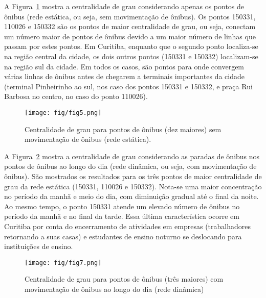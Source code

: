 
A Figura~\ref{fig:centralidade-grau-estatica} mostra a centralidade de grau considerando apenas os pontos de ônibus (rede estática, ou seja, sem movimentação de ônibus). Os pontos 150331, 110026 e 150332 são os pontos de maior centralidade de grau, ou seja, conectam um número maior de pontos de ônibus devido a um maior número de linhas que passam por estes pontos. Em Curitiba, enquanto que o segundo ponto localiza-se na região central da cidade, os dois outros pontos (150331 e 150332) localizam-se na região sul da cidade. Em todos os casos, são pontos para onde convergem várias linhas de ônibus antes de chegarem a terminais importantes da cidade (terminal Pinheirinho ao sul, nos caso dos pontos 150331 e 150332, e praça Rui Barbosa no centro, no caso do ponto 110026). 


\begin{figure}
\centering
\texttt{[image: fig/fig5.png]}
\caption{Centralidade de grau para pontos de ônibus (dez maiores) sem movimentação de ônibus (rede estática).}
\label{fig:centralidade-grau-estatica}
\end{figure}

A Figura~\ref{fig:centralidade-grau-dinamica} mostra a centralidade de grau considerando as paradas de ônibus nos pontos de ônibus ao longo do dia (rede dinâmica, ou seja, com movimentação de ônibus). São mostrados os resultados para os três pontos de maior centralidade de grau da rede estática (150331, 110026 e 150332). Nota-se uma maior concentração no período da manhã e meio do dia, com diminuição gradual até o final da noite. Ao mesmo tempo, o ponto 150331 atende um elevado número de ônibus no período da manhã e no final da tarde. Essa última característica ocorre em Curitiba por conta do encerramento de atividades em empresas (trabalhadores retornando a suas casas) e estudantes de ensino noturno se deslocando para instituições de ensino.



\begin{figure}
\centering
\texttt{[image: fig/fig7.png]}
\caption{Centralidade de grau para pontos de ônibus (três maiores) com movimentação de ônibus ao longo do dia (rede dinâmica)}
\label{fig:centralidade-grau-dinamica}
\end{figure}


